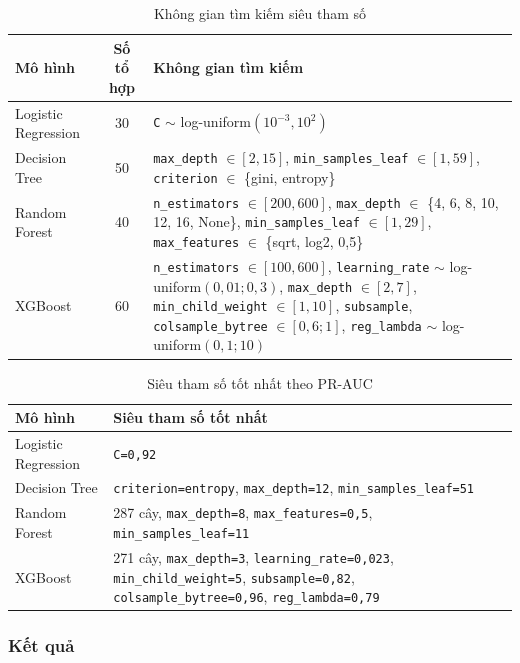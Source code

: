 \begin{table}[H]
\centering
\small
\begin{tabular}{l c p{9.8cm}}
\toprule
\textbf{Mô hình} & \textbf{Số tổ hợp} & \textbf{Không gian tìm kiếm} \\
\midrule
Logistic Regression & 30 & \texttt{C} $\sim$ log-uniform$(10^{-3}, 10^{2})$ \\
Decision Tree & 50 & \texttt{max\_depth} $\in [2, 15]$, \texttt{min\_samples\_leaf} $\in [1, 59]$, \texttt{criterion} $\in$ \{gini, entropy\} \\
Random Forest & 40 & \texttt{n\_estimators} $\in [200, 600]$, \texttt{max\_depth} $\in$ \{4, 6, 8, 10, 12, 16, None\}, \texttt{min\_samples\_leaf} $\in [1, 29]$, \texttt{max\_features} $\in$ \{sqrt, log2, 0,5\} \\
XGBoost & 60 & \texttt{n\_estimators} $\in [100, 600]$, \texttt{learning\_rate} $\sim$ log-uniform$(0{,}01; 0{,}3)$, \texttt{max\_depth} $\in [2, 7]$, \texttt{min\_child\_weight} $\in [1, 10]$, \texttt{subsample}, \texttt{colsample\_bytree} $\in [0{,}6; 1]$, \texttt{reg\_lambda} $\sim$ log-uniform$(0{,}1; 10)$ \\
\bottomrule
\end{tabular}
\caption{Không gian tìm kiếm siêu tham số}
\end{table}

\begin{table}[H]
\centering
\small
\begin{tabular}{l p{10cm}}
\toprule
\textbf{Mô hình} & \textbf{Siêu tham số tốt nhất} \\
\midrule
Logistic Regression & \texttt{C=0,92} \\
Decision Tree & \texttt{criterion=entropy}, \texttt{max\_depth=12}, \texttt{min\_samples\_leaf=51} \\
Random Forest & 287 cây, \texttt{max\_depth=8}, \texttt{max\_features=0,5}, \texttt{min\_samples\_leaf=11} \\
XGBoost & 271 cây, \texttt{max\_depth=3}, \texttt{learning\_rate=0,023}, \texttt{min\_child\_weight=5}, \texttt{subsample=0,82}, \texttt{colsample\_bytree=0,96}, \texttt{reg\_lambda=0,79} \\
\bottomrule
\end{tabular}
\caption{Siêu tham số tốt nhất theo PR-AUC}
\end{table}

\subsubsection{Kết quả}


